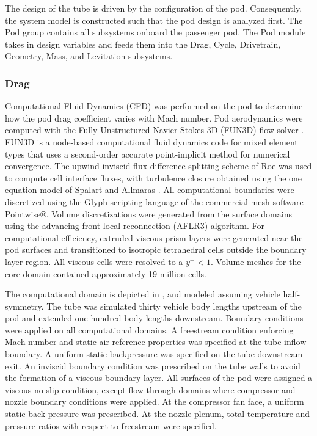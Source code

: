 
	 The design of the tube is driven by the configuration of the pod.
	 Consequently, the system model is constructed such that the pod design is analyzed first.
	 The Pod group contains all subsystems onboard the passenger pod.
	 The Pod module takes in design variables and feeds them into the Drag, Cycle,
	 Drivetrain, Geometry, Mass, and Levitation subsystems.

\subsubsection{Drag}
	Computational Fluid Dynamics (CFD) was performed on the pod to determine
	how the pod drag coefficient varies with Mach number.
	Pod aerodynamics were computed with the Fully Unstructured Navier-Stokes 3D
	(FUN3D) flow solver \cite{Biedron}. FUN3D is a node-based computational fluid dynamics
	code for mixed element types that uses a second-order accurate point-implicit
	method for numerical convergence. The upwind inviscid flux difference
	splitting scheme of Roe \cite{Roe} was used to compute cell interface fluxes,
	with turbulence closure obtained using the one equation model of Spalart
	and Allmaras \cite{Spalart}.
	All computational boundaries were discretized using the Glyph scripting
	language of the commercial mesh software Pointwise®. Volume discretizations
	were generated from the surface domains using the advancing-front local
	reconnection (AFLR3)\cite{Marcum} algorithm. For computational efficiency, extruded
	viscous prism layers were generated near the pod surfaces and transitioned
	to isotropic tetrahedral cells outside the boundary layer region.
	All viscous cells were resolved to a $y^{+} < 1$. Volume meshes for the core
	domain contained approximately 19 million cells.

	The computational domain is depicted in ,
	and modeled assuming vehicle half-symmetry.
	The tube was simulated thirty vehicle body lengths upstream of the pod
	and extended one hundred body lengths downstream. Boundary conditions were
	applied on all computational domains. A freestream condition enforcing Mach
	number and static air reference properties was specified at the tube inflow boundary.
	A uniform static backpressure was specified on the tube downstream exit.
	An inviscid boundary condition was prescribed on the tube walls to avoid
	the formation of a viscous boundary layer. All surfaces of the pod were
	assigned a viscous no-slip condition, except flow-through domains where
	compressor and nozzle boundary conditions were applied. At the compressor
	fan face, a uniform static back-pressure was prescribed. At the nozzle plenum,
	total temperature and pressure ratios with respect to freestream were specified.

